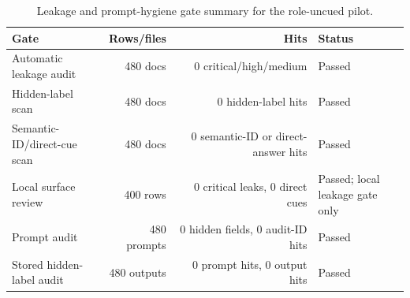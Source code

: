 \begin{table}[t]
    \centering
    \small
    \caption{Leakage and prompt-hygiene gate summary for the role-uncued pilot.}
    \label{tab:leakage-gate-summary}
    \begin{tabularx}{\linewidth}{lrrX}
        \toprule
        Gate & Rows/files & Hits & Status \\
        \midrule
        Automatic leakage audit & 480 docs & 0 critical/high/medium & Passed \\
        Hidden-label scan & 480 docs & 0 hidden-label hits & Passed \\
        Semantic-ID/direct-cue scan & 480 docs & 0 semantic-ID or direct-answer hits & Passed \\
        Local surface review & 400 rows & 0 critical leaks, 0 direct cues & Passed; local leakage gate only \\
        Prompt audit & 480 prompts & 0 hidden fields, 0 audit-ID hits & Passed \\
        Stored hidden-label audit & 480 outputs & 0 prompt hits, 0 output hits & Passed \\
        \bottomrule
    \end{tabularx}
\end{table}
